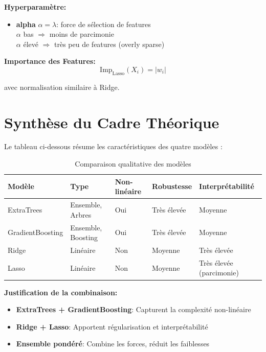 \documentclass[12pt,a4paper,french]{article}
\begin{document}
\textbf{Hyperparamètre:}
\begin{itemize}
    \item \textbf{alpha} $\alpha = \lambda$: force de sélection de features
        \\ $\alpha$ bas $\Rightarrow$ moins de parcimonie
        \\ $\alpha$ élevé $\Rightarrow$ très peu de features (overly sparse)
\end{itemize}

\textbf{Importance des Features:}
\begin{equation}
\text{Imp}_{\text{Lasso}}(X_i) = |w_i|
\end{equation}

avec normalisation similaire à Ridge.

\section{Synthèse du Cadre Théorique}

Le tableau ci-dessous résume les caractéristiques des quatre modèles :

\begin{table}[H]
\centering
\begin{tabular}{lllll}
\toprule
\textbf{Modèle} & \textbf{Type} & \textbf{Non-linéaire} & \textbf{Robustesse} & \textbf{Interprétabilité} \\
\midrule
ExtraTrees & Ensemble, Arbres & Oui & Très élevée & Moyenne \\
GradientBoosting & Ensemble, Boosting & Oui & Très élevée & Moyenne \\
Ridge & Linéaire & Non & Moyenne & Très élevée \\
Lasso & Linéaire & Non & Moyenne & Très élevée (parcimonie) \\
\bottomrule
\end{tabular}
\caption{Comparaison qualitative des modèles}
\end{table}

\textbf{Justification de la combinaison:}
\begin{itemize}
    \item \textbf{ExtraTrees + GradientBoosting}: Capturent la complexité non-linéaire
    \item \textbf{Ridge + Lasso}: Apportent régularisation et interprétabilité
    \item \textbf{Ensemble pondéré}: Combine les forces, réduit les faiblesses
\end{itemize}
\end{document}
